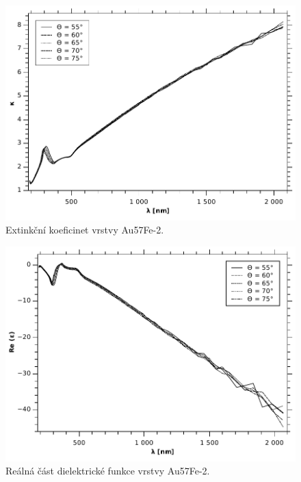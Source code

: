 \documentclass[12pt]{article}
\begin{document}
\begin{figure}
  \centering
  \includegraphics[width=135mm]{img/Au-k.pdf}
  \caption{Extinkční koeficinet vrstvy Au57Fe-2.}
  \label{Auk}
\end{figure}

\begin{figure}
  \centering
  \includegraphics[width=135mm]{img/Au-Ree.pdf}
  \caption{Reálná část dielektrické funkce vrstvy Au57Fe-2.}
  \label{AuRee}
\end{figure}
\end{document}
